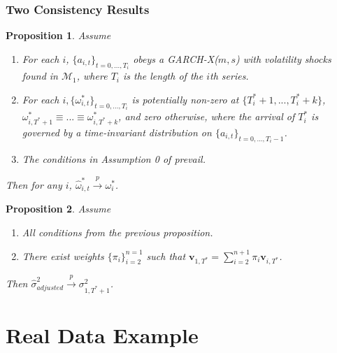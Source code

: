 \documentclass[9pt]{beamer}
\newcommand{\weight}{\pi}
\def\mc#1{\mathcal{#1}} %
\def\mc#1{\mathcal{#1}}
\newtheorem{prop}{Proposition}
\theoremstyle{definition}
\begin{document}
\begin{frame}\frametitle{Two Consistency Results}
    
    \begin{prop}\label{omega_consistency}
    Assume
    \begin{enumerate}
      \item For each $i$, $\{a_{i,t}\}_{t=0,...,T_i}$ obeys a GARCH-X($m,s$) with volatility shocks found in $\mc{M}_{1}$, where $T_i$ is the length of the $i$th series.
      \item For each $i, \{\omega_{i,t}^{*}\}_{t=0,...,T_i}$ is potentially non-zero at $\{T^{*}_{i}+1,... ,T^{*}_{i}+k\}$, $\omega_{i,T^{*}+1}^{*}\equiv...\equiv\omega_{i,T^{*}+k}^{*}$, and zero otherwise, where the arrival of $T_{i}^{*}$ is governed by a time-invariant distribution on $\{a_{i,t}\}_{t=0,...,T_i-1}$. \label{stationarity_of_omega_i_t}
      \item The conditions in Assumption 0 of \cite[][]{han2014asymptotic} prevail.
    \end{enumerate}
    Then for any $i$, $\hat\omega_{i,t}^{*} \xrightarrow{p} \omega_{i}^{*}$.
    \end{prop}

    \begin{prop}\label{sigma_consistency}
        Assume
        \begin{enumerate}
          \item All conditions from the previous proposition.
          \item There exist weights $\{\pi_{i}\}_{i=2}^{n=1}$ such that $\textbf{v}_{1,T^{*}} = \sum^{n+1}_{i=2}\weight_{i} \textbf{v}_{i,T^{*}}$.
         \end{enumerate}
      Then $\hat\sigma^{2}_{adjusted}\xrightarrow{p}\sigma^{2}_{1,T^{*}+1}$. 
      \end{prop}

\end{frame}

\section{Real Data Example}
\end{document}
